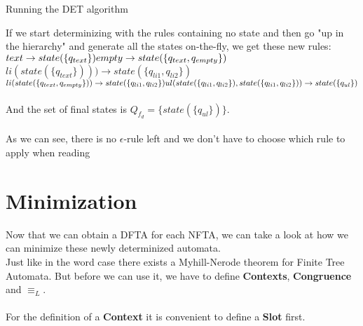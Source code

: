 \documentclass{llncs}
\begin{document}
\begin{example}{Running the DET algorithm}
\begin{center}
			\end{center}
					If we start determinizing with the rules containing no state and then go "up in the hierarchy" and generate all the states on-the-fly, we get these new rules:
					\\
					\(
					\\
					text \rightarrow state(\{q_{text}\})
					\\
					empty \rightarrow state(\{q_{text}, q_{empty}\})\)
					\\
					\(li(state(\{q_{text}\}))) \rightarrow state(\{q_{li1}, q_{li2}\})\)
					\newline
					\(li(state(\{q_{text}, q_{empty}\})) \rightarrow state(\{q_{li1}, q_{li2}\})
					\\
					ul(state(\{q_{li1}, q_{li2}\}), state(\{q_{li1}, q_{li2}\})) \rightarrow state(\{q_{ul}\})
					\)
					\\
					\\
				    And the set of final states is \(Q_{f_d} = \{state(\{q_{ul}\})\}\).
				    \\
				    \\
				    As we can see, there is no \(\epsilon\)-rule left and we don't have to choose which rule to apply when reading 
			\end{example}

\pagebreak

\chapter*{Minimization}

Now that we can obtain a DFTA for each NFTA, we can take a look at how we can minimize these newly determinized automata.
\\
Just like in the word case there exists a Myhill-Nerode theorem for Finite Tree Automata. But before we can use it, we have to define \textbf{Contexts}, \textbf{Congruence} and \(\equiv_L\).
\\\\
For the definition of a \textbf{Context} it is convenient to define a \textbf{Slot} first.
\end{document}
